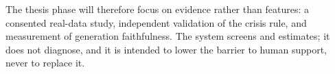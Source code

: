 The thesis phase will therefore focus on evidence rather than features: a consented real-data study, independent validation of the crisis rule, and measurement of generation faithfulness. The system screens and estimates; it does not diagnose, and it is intended to lower the barrier to human support, never to replace it.

